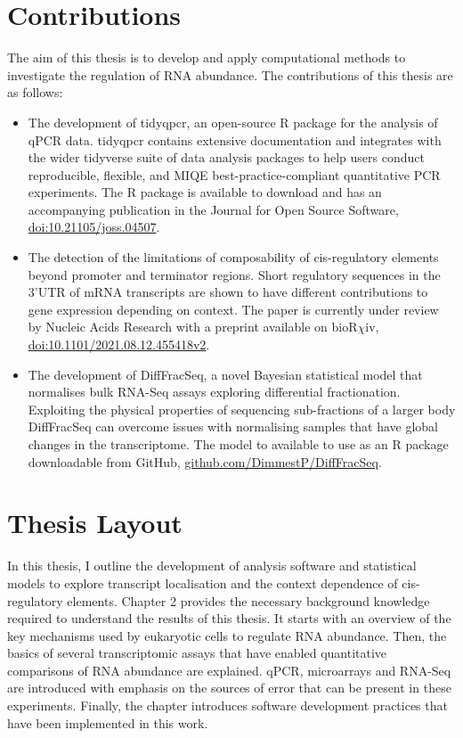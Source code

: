 \documentclass[../main.tex]{subfiles}
\begin{document}
\section{Contributions}
The aim of this thesis is to develop and apply computational methods to investigate the regulation of RNA abundance.
The contributions of this thesis are as follows:

\begin{itemize}
    \item The development of tidyqpcr, an open-source R package for the analysis of qPCR data. 
    tidyqpcr contains extensive documentation and integrates with the wider tidyverse suite of data analysis packages to help users conduct reproducible, flexible, and MIQE best-practice-compliant quantitative PCR experiments.
    The R package is available to download and has an accompanying publication in the Journal for Open Source Software, \href{https://joss.theoj.org/papers/10.21105/joss.04507}{doi:10.21105/joss.04507}.
    \item  The detection of the limitations of composability of cis-regulatory elements beyond promoter and terminator regions.
    Short regulatory sequences in the 3'UTR of mRNA transcripts are shown to have different contributions to gene expression depending on context.
    The paper is currently under review by Nucleic Acids Research with a preprint available on bioR$\chi$iv, \href{https://www.biorxiv.org/content/10.1101/2021.08.12.455418v2}{doi:10.1101/2021.08.12.455418v2}.
    \item The development of DiffFracSeq, a novel Bayesian statistical model that normalises bulk RNA-Seq assays exploring differential fractionation. 
    Exploiting the physical properties of sequencing sub-fractions of a larger body DiffFracSeq can overcome issues with normalising samples that have global changes in the transcriptome.
    The model to available to use as an R package downloadable from GitHub, \href{https://github.com/DimmestP/DiffFracSeq}{github.com/DimmestP/DiffFracSeq}.
\end{itemize}

\section{Thesis Layout}

In this thesis, I outline the development of analysis software and statistical models to explore transcript localisation and the context dependence of cis-regulatory elements.
Chapter 2 provides the necessary background knowledge required to understand the results of this thesis.
It starts with an overview of the key mechanisms used by eukaryotic cells to regulate RNA abundance. 
Then, the basics of several transcriptomic assays that have enabled quantitative comparisons of RNA abundance are explained. 
qPCR, microarrays and RNA-Seq are introduced with emphasis on the sources of error that can be present in these experiments. 
Finally, the chapter introduces software development practices that have been implemented in this work. 
\end{document}

